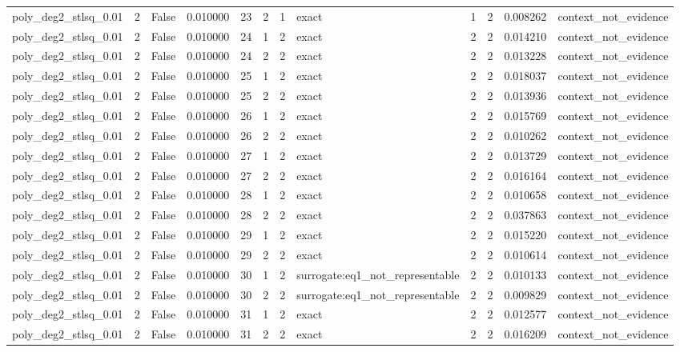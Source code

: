 \begin{tabular}{lrrrrrrlrrrl}
poly\_deg2\_stlsq\_0.01 & 2 & False & 0.010000 & 23 & 2 & 1 & exact & 1 & 2 & 0.008262 & context\_not\_evidence \\
poly\_deg2\_stlsq\_0.01 & 2 & False & 0.010000 & 24 & 1 & 2 & exact & 2 & 2 & 0.014210 & context\_not\_evidence \\
poly\_deg2\_stlsq\_0.01 & 2 & False & 0.010000 & 24 & 2 & 2 & exact & 2 & 2 & 0.013228 & context\_not\_evidence \\
poly\_deg2\_stlsq\_0.01 & 2 & False & 0.010000 & 25 & 1 & 2 & exact & 2 & 2 & 0.018037 & context\_not\_evidence \\
poly\_deg2\_stlsq\_0.01 & 2 & False & 0.010000 & 25 & 2 & 2 & exact & 2 & 2 & 0.013936 & context\_not\_evidence \\
poly\_deg2\_stlsq\_0.01 & 2 & False & 0.010000 & 26 & 1 & 2 & exact & 2 & 2 & 0.015769 & context\_not\_evidence \\
poly\_deg2\_stlsq\_0.01 & 2 & False & 0.010000 & 26 & 2 & 2 & exact & 2 & 2 & 0.010262 & context\_not\_evidence \\
poly\_deg2\_stlsq\_0.01 & 2 & False & 0.010000 & 27 & 1 & 2 & exact & 2 & 2 & 0.013729 & context\_not\_evidence \\
poly\_deg2\_stlsq\_0.01 & 2 & False & 0.010000 & 27 & 2 & 2 & exact & 2 & 2 & 0.016164 & context\_not\_evidence \\
poly\_deg2\_stlsq\_0.01 & 2 & False & 0.010000 & 28 & 1 & 2 & exact & 2 & 2 & 0.010658 & context\_not\_evidence \\
poly\_deg2\_stlsq\_0.01 & 2 & False & 0.010000 & 28 & 2 & 2 & exact & 2 & 2 & 0.037863 & context\_not\_evidence \\
poly\_deg2\_stlsq\_0.01 & 2 & False & 0.010000 & 29 & 1 & 2 & exact & 2 & 2 & 0.015220 & context\_not\_evidence \\
poly\_deg2\_stlsq\_0.01 & 2 & False & 0.010000 & 29 & 2 & 2 & exact & 2 & 2 & 0.010614 & context\_not\_evidence \\
poly\_deg2\_stlsq\_0.01 & 2 & False & 0.010000 & 30 & 1 & 2 & surrogate:eq1\_not\_representable & 2 & 2 & 0.010133 & context\_not\_evidence \\
poly\_deg2\_stlsq\_0.01 & 2 & False & 0.010000 & 30 & 2 & 2 & surrogate:eq1\_not\_representable & 2 & 2 & 0.009829 & context\_not\_evidence \\
poly\_deg2\_stlsq\_0.01 & 2 & False & 0.010000 & 31 & 1 & 2 & exact & 2 & 2 & 0.012577 & context\_not\_evidence \\
poly\_deg2\_stlsq\_0.01 & 2 & False & 0.010000 & 31 & 2 & 2 & exact & 2 & 2 & 0.016209 & context\_not\_evidence \\

\end{tabular}
